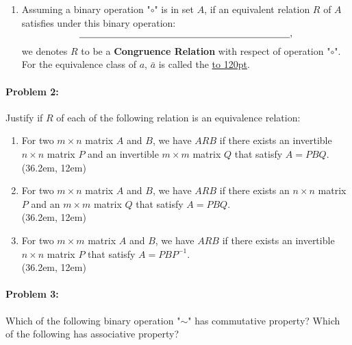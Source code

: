 \documentclass[12pt]{scrartcl}
\begin{document}
{{\begin{enumerate}[label=(\alph*)]
	\item Assuming a binary operation "$\circ$" is in set $A$, if an equivalent relation $R$ of $A$ satisfies under this binary operation: $$\underline{\hbox to 220pt{}},$$ we denotes $R$ to be a \textbf{Congruence Relation} with respect of operation "$\circ$". For the equivalence class of $a$, $\bar{a}$ is called the \underline{\hbox to 120pt{}}. 

	\end{enumerate}

\newpage

\paragraph*{Problem 2: } Justify if $R$ of each of the following relation is an equivalence relation:

	\begin{enumerate}[label=\arabic*)]
	
	\item For two $m \times n$ matrix $A$ and $B$, we have $ARB$ if there exists an invertible $n \times n$ matrix $P$ and an invertible $m \times m$ matrix $Q$ that satisfy $A=PBQ$.\\

	\framebox(36.2em, 12em){}\\

	\item For two $m \times n$ matrix $A$ and $B$, we have $ARB$ if there exists an $n \times n$ matrix $P$ and an $m \times m$ matrix $Q$ that satisfy $A=PBQ$.\\

	\framebox(36.2em, 12em){}\\

	\item For two $m \times m$ matrix $A$ and $B$, we have $ARB$ if there exists an invertible $n \times n$ matrix $P$ that satisfy $A=PBP^{-1}$.\\

	\framebox(36.2em, 12em){}

	\end{enumerate}

\newpage

\paragraph*{Problem 3: } Which of the following binary operation "$\sim$" has commutative property? Which of the following has associative property?

}}
\end{document}
